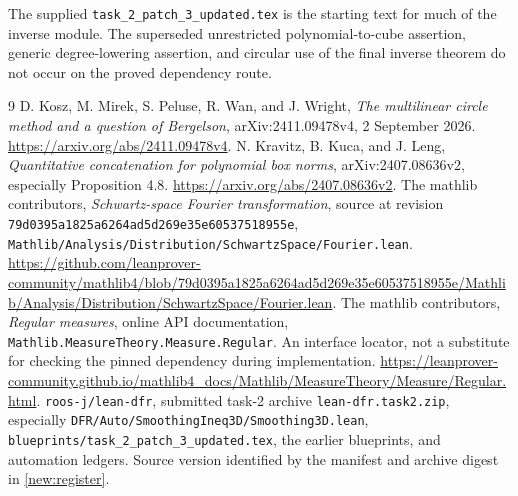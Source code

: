\documentclass[11pt]{article}
\theoremstyle{definition}
\newcommand{\pid}[1]{\nolinkurl{#1}}
\begin{document}
The supplied \pid{task_2_patch_3_updated.tex} is the starting text for much of the inverse module.
The superseded unrestricted polynomial-to-cube assertion, generic degree-lowering assertion,
and circular use of the final inverse theorem do not occur on the proved dependency route.

\begin{thebibliography}{9}
D. Kosz, M. Mirek, S. Peluse, R. Wan, and J. Wright,
\emph{The multilinear circle method and a question of Bergelson},
arXiv:2411.09478v4, 2 September 2026.
\url{https://arxiv.org/abs/2411.09478v4}.
N. Kravitz, B. Kuca, and J. Leng,
\emph{Quantitative concatenation for polynomial box norms},
arXiv:2407.08636v2, especially Proposition 4.8.
\url{https://arxiv.org/abs/2407.08636v2}.
The mathlib contributors, \emph{Schwartz-space Fourier transformation}, source at revision
\pid{79d0395a1825a6264ad5d269e35e60537518955e},
\pid{Mathlib/Analysis/Distribution/SchwartzSpace/Fourier.lean}.
\url{https://github.com/leanprover-community/mathlib4/blob/79d0395a1825a6264ad5d269e35e60537518955e/Mathlib/Analysis/Distribution/SchwartzSpace/Fourier.lean}.
The mathlib contributors, \emph{Regular measures}, online API documentation,
\pid{Mathlib.MeasureTheory.Measure.Regular}. An interface locator, not a substitute for
checking the pinned dependency during implementation.
\url{https://leanprover-community.github.io/mathlib4_docs/Mathlib/MeasureTheory/Measure/Regular.html}.
\texttt{roos-j/lean-dfr}, submitted task-2 archive \pid{lean-dfr.task2.zip}, especially
\pid{DFR/Auto/SmoothingIneq3D/Smoothing3D.lean},
\pid{blueprints/task_2_patch_3_updated.tex}, the earlier blueprints, and automation ledgers.
Source version identified by the manifest and archive digest in \cref{new:register}.
\end{thebibliography}
\end{document}
